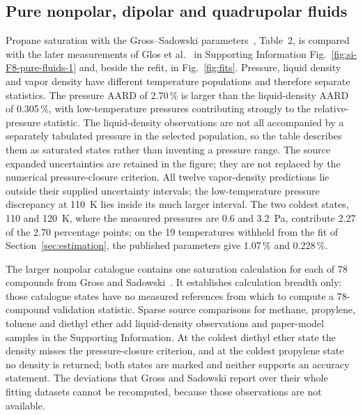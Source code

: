 \subsection{Pure nonpolar, dipolar and quadrupolar fluids}
Propane saturation with the Gross--Sadowski parameters~\citep{Gross2001}, Table~2, is compared with the later measurements of Glos et al.~\citep{Glos2004} in Supporting Information Fig.~\ref{fig:si-F8-pure-fluids-1} and, beside the refit, in Fig.~\ref{fig:fits}.
Pressure, liquid density and vapor density have different temperature populations and therefore separate statistics.
The pressure AARD of 2.70\,\% is larger than the liquid-density AARD of 0.305\,\%, with low-temperature pressures contributing strongly to the relative-pressure statistic.
The liquid-density observations are not all accompanied by a separately tabulated pressure in the selected population, so the table describes them as saturated states rather than inventing a pressure range.
The source expanded uncertainties are retained in the figure; they are not replaced by the numerical pressure-closure criterion.
All twelve vapor-density predictions lie outside their supplied uncertainty intervals; the low-temperature pressure discrepancy at 110~K lies inside its much larger interval.
The two coldest states, 110 and 120~K, where the measured pressures are 0.6 and 3.2~Pa, contribute 2.27 of the 2.70 percentage points; on the 19 temperatures withheld from the fit of Section~\ref{sec:estimation}, the published parameters give 1.07\,\% and 0.228\,\%.

The larger nonpolar catalogue contains one saturation calculation for each of 78 compounds from Gross and Sadowski~\citep{Gross2001}.
It establishes calculation breadth only: those catalogue states have no measured references from which to compute a 78-compound validation statistic.
Sparse source comparisons for methane, propylene, toluene and diethyl ether add liquid-density observations and paper-model samples in the Supporting Information.
At the coldest diethyl ether state the density misses the pressure-closure criterion, and at the coldest propylene state no density is returned; both states are marked and neither supports an accuracy statement.
The deviations that Gross and Sadowski report over their whole fitting datasets cannot be recomputed, because those observations are not available.

